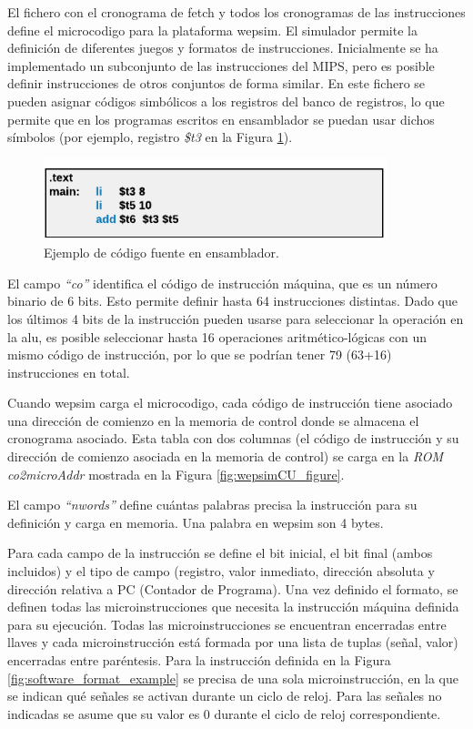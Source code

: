 \vspace{10mm}

El fichero con el cronograma de fetch y todos los cronogramas de las instrucciones define el \gls{microcodigo} para la plataforma \acrshort{wepsim}. El simulador permite la definición de diferentes juegos y formatos de instrucciones. Inicialmente se ha implementado un subconjunto de las instrucciones del MIPS, pero es posible definir instrucciones de otros conjuntos de forma similar. En este fichero se pueden asignar códigos simbólicos a los registros del banco de registros, lo que permite que en los programas escritos en \gls{ensamblador} se puedan usar dichos  símbolos (por ejemplo, registro \emph{\$t3} en la Figura \ref{fig:software_assembly_example}).

\begin{figure}[htbp]
 	\centering
 	\includegraphics[width=10cm]{figures/example_assembly}
 	\caption{Ejemplo de código fuente en \gls{ensamblador}.}
	\label{fig:software_assembly_example}
\end{figure}

El campo \emph{``co''} identifica el código de instrucción máquina, que es un número binario de 6 bits. Esto permite definir hasta 64 instrucciones distintas. Dado que los últimos 4 bits de la instrucción pueden usarse para seleccionar la operación en la \acrshort{alu}, es posible seleccionar hasta 16 operaciones aritmético-lógicas con un mismo código de instrucción, por lo que se podrían tener 79 (63+16) instrucciones en total.

Cuando \acrshort{wepsim} carga el \gls{microcodigo}, cada código de instrucción tiene asociado una dirección de comienzo en la memoria de control donde se almacena el cronograma asociado. Esta tabla con dos columnas (el código de instrucción y su dirección de comienzo asociada en la memoria de control) se carga en la \emph{ROM co2microAddr} mostrada en la Figura \ref{fig:wepsimCU_figure}.

El campo \emph{``nwords''} define cuántas palabras precisa la instrucción para su definición y carga en memoria. Una palabra en \acrshort{wepsim} son 4 bytes.

Para cada campo de la instrucción se define el bit inicial, el bit final (ambos incluidos) y el tipo de campo (registro, valor inmediato, dirección absoluta y dirección relativa a PC (Contador de Programa). Una vez definido el formato, se definen todas las microinstrucciones que necesita la instrucción máquina definida para su ejecución. Todas las microinstrucciones se encuentran encerradas entre llaves y cada microinstrucción está formada por una lista de tuplas (señal, valor) encerradas entre paréntesis. Para la instrucción definida en la Figura \ref{fig:software_format_example} se precisa de una sola microinstrucción, en la que se indican qué señales se activan durante un ciclo de reloj. Para las señales no indicadas se asume que su valor es 0 durante el ciclo de reloj correspondiente.


